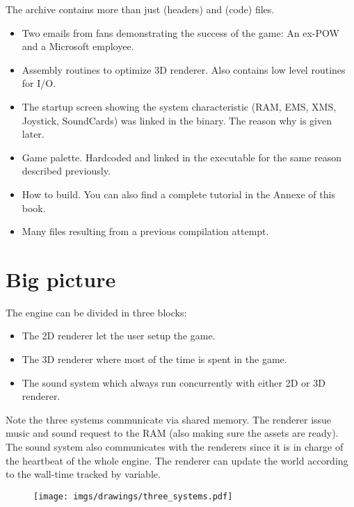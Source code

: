 \documentclass[book.tex]{subfiles}
\begin{document}
The archive contains more than just  (headers) and  (code) files.
\begin{itemize}
\item {} Two emails from fans demonstrating the success of the game: An ex-POW and a Microsoft employee.
\item {} Assembly routines to optimize 3D renderer. Also contains low level routines for I/O.
\item {} The startup screen showing the system characteristic (RAM, EMS, XMS, Joystick, SoundCards) was linked in the binary. The reason why is given later.
\item {} Game palette. Hardcoded and linked in the executable for the same reason described previously.
\item {} How to build. You can also find a complete tutorial in the Annexe of this book.
\item Many files resulting from a previous compilation attempt.
\end{itemize}







\section{Big picture}
The engine can be divided in three blocks:
\begin{itemize}
\item The 2D renderer let the user setup the game.
\item The 3D renderer where most of the time is spent in the game.
\item The sound system which always run concurrently with either 2D or 3D renderer. 
\end{itemize}
Note the three systems communicate via shared memory. The renderer issue music and sound request to the RAM (also making sure the assets are ready). The sound system also communicates with the renderers since it is in charge of the heartbeat of the whole engine. The renderer can update the world according to the wall-time tracked by  variable.
\par
\begin{figure}[H]
\centering
 \texttt{[image: imgs/drawings/three\_systems.pdf]}
 \end{figure}
 \par
\end{document}
